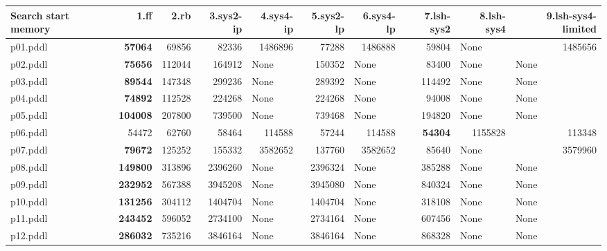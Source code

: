 \documentclass{article}
\begin{document}
\begin{tabular}{@{}lrrrrrrrrr@{}}
Search start memory & 1.ff & 2.rb & 3.sys2-ip & 4.sys4-ip & 5.sys2-lp & 6.sys4-lp & 7.lsh-sys2 & 8.lsh-sys4 & 9.lsh-sys4-limited \\
\midrule
p01.pddl & \textbf{57064} & 69856 & 82336 & 1486896 & 77288 & 1486888 & 59804 & \multicolumn{1}{|l|}{None} & 1485656 \\
p02.pddl & \textbf{75656} & 112044 & 164912 & \multicolumn{1}{|l|}{None} & 150352 & \multicolumn{1}{|l|}{None} & 83400 & \multicolumn{1}{|l|}{None} & \multicolumn{1}{|l|}{None} \\
p03.pddl & \textbf{89544} & 147348 & 299236 & \multicolumn{1}{|l|}{None} & 289392 & \multicolumn{1}{|l|}{None} & 114492 & \multicolumn{1}{|l|}{None} & \multicolumn{1}{|l|}{None} \\
p04.pddl & \textbf{74892} & 112528 & 224268 & \multicolumn{1}{|l|}{None} & 224268 & \multicolumn{1}{|l|}{None} & 94008 & \multicolumn{1}{|l|}{None} & \multicolumn{1}{|l|}{None} \\
p05.pddl & \textbf{104008} & 207800 & 739500 & \multicolumn{1}{|l|}{None} & 739468 & \multicolumn{1}{|l|}{None} & 194820 & \multicolumn{1}{|l|}{None} & \multicolumn{1}{|l|}{None} \\
p06.pddl & 54472 & 62760 & 58464 & 114588 & 57244 & 114588 & \textbf{54304} & 1155828 & 113348 \\
p07.pddl & \textbf{79672} & 125252 & 155332 & 3582652 & 137760 & 3582652 & 85640 & \multicolumn{1}{|l|}{None} & 3579960 \\
p08.pddl & \textbf{149800} & 313896 & 2396260 & \multicolumn{1}{|l|}{None} & 2396324 & \multicolumn{1}{|l|}{None} & 385288 & \multicolumn{1}{|l|}{None} & \multicolumn{1}{|l|}{None} \\
p09.pddl & \textbf{232952} & 567388 & 3945208 & \multicolumn{1}{|l|}{None} & 3945080 & \multicolumn{1}{|l|}{None} & 840324 & \multicolumn{1}{|l|}{None} & \multicolumn{1}{|l|}{None} \\
p10.pddl & \textbf{131256} & 304112 & 1404704 & \multicolumn{1}{|l|}{None} & 1404704 & \multicolumn{1}{|l|}{None} & 318108 & \multicolumn{1}{|l|}{None} & \multicolumn{1}{|l|}{None} \\
p11.pddl & \textbf{243452} & 596052 & 2734100 & \multicolumn{1}{|l|}{None} & 2734164 & \multicolumn{1}{|l|}{None} & 607456 & \multicolumn{1}{|l|}{None} & \multicolumn{1}{|l|}{None} \\
p12.pddl & \textbf{286032} & 735216 & 3846164 & \multicolumn{1}{|l|}{None} & 3846164 & \multicolumn{1}{|l|}{None} & 868328 & \multicolumn{1}{|l|}{None} & \multicolumn{1}{|l|}{None} \\

\end{tabular}
\end{document}
